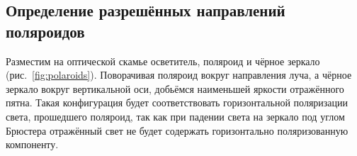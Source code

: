 \documentclass[a4paper, 12pt]{article}
\begin{document}
\subsection{Определение разрешённых направлений поляроидов}

Разместим на оптической скамье осветитель, поляроид и чёрное зеркало (рис.~\ref{fig:polaroids}). Поворачивая поляроид вокруг направления луча, а чёрное зеркало вокруг вертикальной оси, добьёмся наименьшей яркости отражённого пятна. Такая конфигурация будет соответствовать горизонтальной поляризации света, прошедшего поляроид, так как при падении света на зеркало под углом Брюстера отражённый свет не будет содержать горизонтально поляризованную компоненту.

\begin{figure}[h!]
		\begin{minipage}[h!]{0.3\linewidth}
		\end{minipage}
		\hfill
		\begin{minipage}[h!]{0.3\linewidth}

\end{minipage}
\end{figure}
\end{document}
